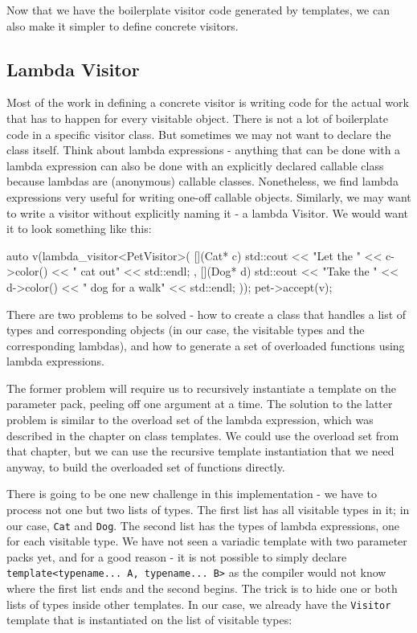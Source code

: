 Now that we have the boilerplate visitor code generated by templates, we can also make it simpler to define concrete visitors.

\subsection{Lambda Visitor}

Most of the work in defining a concrete visitor is writing code for the actual work that has to happen for every visitable object. There is not a lot of boilerplate code in a specific visitor class. But sometimes we may not want to declare the class itself. Think about lambda expressions - anything that can be done with a lambda expression can also be done with an explicitly declared callable class because lambdas are (anonymous) callable classes. Nonetheless, we find lambda expressions very useful for writing one-off callable objects. Similarly, we may want to write a visitor without explicitly naming it - a lambda Visitor. We would want it to look something like this:

\begin{code}
auto v(lambda_visitor<PetVisitor>(
  [](Cat* c) { std::cout << "Let the " << c->color()
                         << " cat out" << std::endl;
  },
  [](Dog* d) { std::cout << "Take the " << d->color()
                         << " dog for a walk" << std::endl;
  }
));
pet->accept(v);
\end{code}

There are two problems to be solved - how to create a class that handles a list of types and corresponding objects (in our case, the visitable types and the corresponding lambdas), and how to generate a set of overloaded functions using lambda expressions.

The former problem will require us to recursively instantiate a template on the parameter pack, peeling off one argument at a time. The solution to the latter problem is similar to the overload set of the lambda expression, which was described in the chapter on class templates. We could use the overload set from that chapter, but we can use the recursive template instantiation that we need anyway, to build the overloaded set of functions directly.

There is going to be one new challenge in this implementation - we have to process not one but two lists of types. The first list has all visitable types in it; in our case, \texttt{Cat} and \texttt{Dog}. The second list has the types of lambda expressions, one for each visitable type. We have not seen a variadic template with two parameter packs yet, and for a good reason - it is not possible to simply declare \texttt{template\textless{}typename...\ A,\ typename...\ B\textgreater{}} as the compiler would not know where the first list ends and the second begins. The trick is to hide one or both lists of types inside other templates. In our case, we already have the \texttt{Visitor} template that is instantiated on the list of visitable types:

